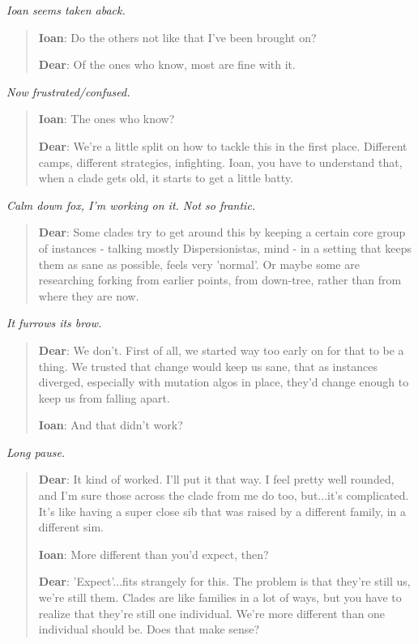 \emph{Ioan seems taken aback.}

\begin{quote}
\textbf{Ioan}: Do the others not like that I've been brought on?

\textbf{Dear}: Of the ones who know, most are fine with it.
\end{quote}

\emph{Now frustrated/confused.}

\begin{quote}
\textbf{Ioan}: The ones who know?

\textbf{Dear}: We're a little split on how to tackle this in the first place. Different camps, different strategies, infighting. Ioan, you have to understand that, when a clade gets old, it starts to get a little batty.
\end{quote}

\emph{Calm down fox, I'm working on it. Not so frantic.}

\begin{quote}
\textbf{Dear}: Some clades try to get around this by keeping a certain core group of instances - talking mostly Dispersionistas, mind - in a setting that keeps them as sane as possible, feels very 'normal'. Or maybe some are researching forking from earlier points, from down-tree, rather than from where they are now.
\end{quote}

\emph{It furrows its brow.}

\begin{quote}
\textbf{Dear}: We don't. First of all, we started way too early on for that to be a thing. We trusted that change would keep us sane, that as instances diverged, especially with mutation algos in place, they'd change enough to keep us from falling apart.

\textbf{Ioan}: And that didn't work?
\end{quote}

\emph{Long pause.}

\begin{quote}
\textbf{Dear}: It kind of worked. I'll put it that way. I feel pretty well rounded, and I'm sure those across the clade from me do too, but...it's complicated. It's like having a super close sib that was raised by a different family, in a different sim.

\textbf{Ioan}: More different than you'd expect, then?

\textbf{Dear}: 'Expect'...fits strangely for this. The problem is that they're still us, we're still them. Clades are like families in a lot of ways, but you have to realize that they're still one individual. We're more different than one individual should be. Does that make sense?
\end{quote}

